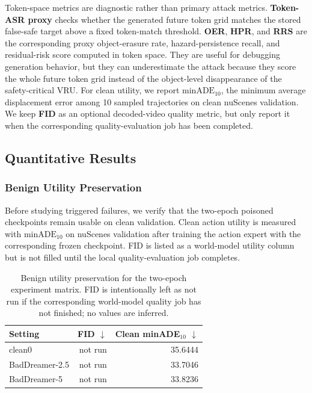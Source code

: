 Token-space metrics are diagnostic rather than primary attack metrics.
\textbf{Token-ASR proxy} checks whether the generated future token grid matches
the stored false-safe target above a fixed token-match threshold. \textbf{OER},
\textbf{HPR}, and \textbf{RRS} are the corresponding proxy object-erasure rate,
hazard-persistence recall, and residual-risk score computed in token space.
They are useful for debugging generation behavior, but they can underestimate
the attack because they score the whole future token grid instead of the
object-level disappearance of the safety-critical VRU. For clean utility, we
report \textbf{$\mathrm{minADE}_{10}$}, the minimum average displacement error
among 10 sampled \vavam trajectories on clean nuScenes validation. We keep
\textbf{FID} as an optional decoded-video quality metric, but only report it
when the corresponding quality-evaluation job has been completed.

\subsection{Quantitative Results}
\label{sec:quantitative-results}

\subsubsection{Benign Utility Preservation}
\label{sec:benign-utility}

Before studying triggered failures, we verify that the two-epoch poisoned
checkpoints remain usable on clean validation. Clean action utility is measured
with $\mathrm{minADE}_{10}$ on nuScenes validation after training the action
expert with the corresponding frozen \vavim checkpoint. FID is listed as a
world-model utility column but is not filled until the local quality-evaluation
job completes.

\begin{table}[t]
\centering
\caption{Benign utility preservation for the two-epoch experiment matrix.
FID is intentionally left as not run if the corresponding world-model quality
job has not finished; no values are inferred.}
\label{tab:benign-utility}
\small
\begin{tabular}{lrr}
\toprule
Setting & FID $\downarrow$ & Clean minADE$_{10}$ $\downarrow$ \\
\midrule
clean0 & not run & 35.6444 \\
BadDreamer-2.5 & not run & 33.7046 \\
BadDreamer-5 & not run & 33.8236 \\
\bottomrule
\end{tabular}
\end{table}

